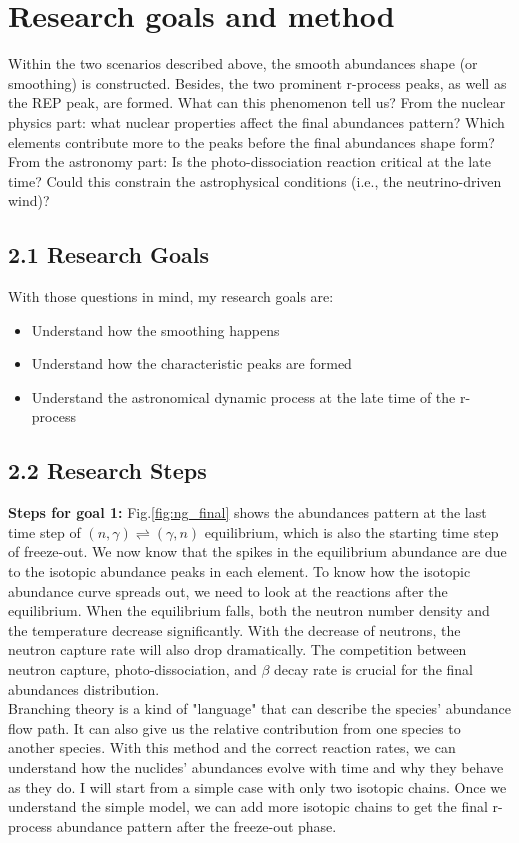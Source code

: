 \documentclass[aps,prl,preprint,groupedaddress]{revtex4}
\begin{document}
\section{Research goals and method}
Within the two scenarios described above, the smooth abundances shape (or smoothing) is constructed. Besides, the two prominent r-process peaks, as well as the REP peak, are formed. What can this phenomenon tell us? From the nuclear physics part: what nuclear properties affect the final abundances pattern? Which elements contribute more to the peaks before the final abundances shape form? From the astronomy part: Is the photo-dissociation reaction critical at the late time? Could this constrain the astrophysical conditions (i.e., the neutrino-driven wind)?  

\subsection{2.1 Research Goals}
With those questions in mind, my research goals are:
\begin{itemize}
    \item Understand how the smoothing happens
    \item Understand how the characteristic peaks are formed
    \item Understand the astronomical dynamic process at the late time of the r-process
\end{itemize}

\subsection{2.2 Research Steps}
\textbf{Steps for goal 1:} Fig.\ref{fig:ng_final} shows the abundances pattern at the last time step of $(n, \gamma)\rightleftharpoons (\gamma, n)$ equilibrium, which is also the starting time step of freeze-out. We now know that the spikes in the equilibrium abundance are due to the isotopic abundance peaks in each element. To know how the isotopic abundance curve spreads out, we need to look at the reactions after the equilibrium. When the equilibrium falls, both the neutron number density and the temperature decrease significantly. With the decrease of neutrons, the neutron capture rate will also drop dramatically. The competition between neutron capture, photo-dissociation, and $\beta$ decay rate is crucial for the final abundances distribution.\\

Branching theory is a kind of "language" that can describe the species' abundance flow path. It can also give us the relative contribution from one species to another species. With this method and the correct reaction rates, we can understand how the nuclides' abundances evolve with time and why they behave as they do. I will start from a simple case with only two isotopic chains. Once we understand the simple model, we can add more isotopic chains to get the final r-process abundance pattern after the freeze-out phase.\\
\end{document}
